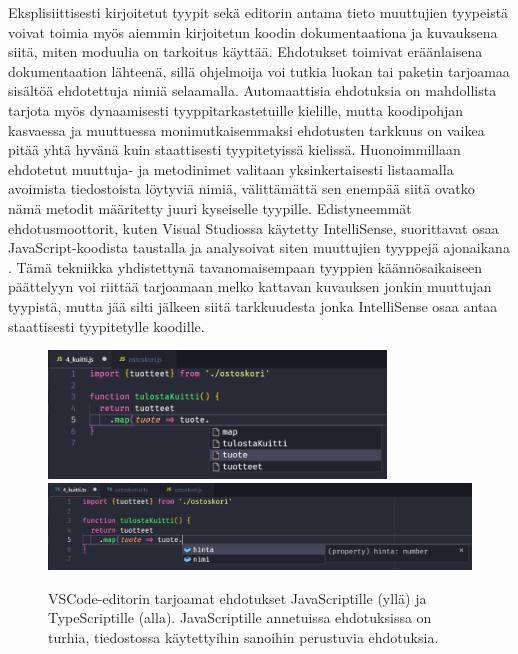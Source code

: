 Eksplisiittisesti kirjoitetut tyypit sekä editorin antama tieto muuttujien
tyypeistä voivat toimia myös aiemmin kirjoitetun koodin dokumentaationa ja
kuvauksena siitä, miten moduulia on tarkoitus käyttää.
Ehdotukset toimivat eräänlaisena dokumentaation lähteenä,
sillä ohjelmoija voi tutkia luokan tai
paketin tarjoamaa sisältöä ehdotettuja nimiä selaamalla. Automaattisia ehdotuksia
on mahdollista tarjota myös dynaamisesti tyyppitarkastetuille kielille, mutta
koodipohjan kasvaessa ja muuttuessa monimutkaisemmaksi ehdotusten tarkkuus
on vaikea pitää yhtä hyvänä kuin staattisesti tyypitetyissä kielissä.
Huonoimmillaan ehdotetut muuttuja- ja metodinimet valitaan yksinkertaisesti
listaamalla avoimista tiedostoista löytyviä nimiä, välittämättä sen
enempää siitä ovatko nämä metodit määritetty juuri kyseiselle tyypille.
Edistyneemmät ehdotusmoottorit, kuten Visual Studiossa käytetty IntelliSense,
suorittavat osaa JavaScript-koodista taustalla ja analysoivat siten muuttujien
tyyppejä ajonaikana \cite{PreviewingSalsa, JavaScriptIntellisense}.
Tämä tekniikka yhdistettynä tavanomaisempaan tyyppien
käännösaikaiseen päättelyyn voi riittää tarjoamaan melko kattavan kuvauksen
jonkin muuttujan tyypistä, mutta jää silti jälkeen siitä tarkkuudesta jonka
IntelliSense osaa antaa staattisesti tyypitetylle koodille.
\begin{figure}
\includegraphics[width=0.8\textwidth]{images/intellisense_javascript}
\includegraphics[width=\textwidth]{images/intellisense_typescript}
\noindent
\caption{
  VSCode-editorin tarjoamat ehdotukset JavaScriptille (yllä) ja TypeScriptille (alla).
  JavaScriptille annetuissa ehdotuksissa on turhia, tiedostossa käytettyihin
  sanoihin perustuvia ehdotuksia.}
\label{fig:Suggestions}
\end{figure}

